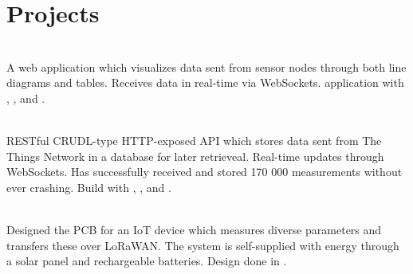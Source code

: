 \documentclass[]{resume-build}
\begin{document}
\begin{minipage}[t]{0.65\textwidth}
\section{Projects}
\\
\descript{}
A web application which visualizes data sent from sensor nodes through both line diagrams and tables. Receives data in real-time via WebSockets.  application with , , and .
\subsectionsep

\\
\descript{}
RESTful CRUDL-type HTTP-exposed API which stores data sent from The Things Network in a database for later retrieveal. Real-time updates through WebSockets. Has successfully received and stored 170 000 measurements without ever crashing. Build with , , and .
\subsectionsep 

\\
\descript{}
Designed the PCB for an IoT device which measures diverse parameters and transfers these over LoRaWAN. The system is self-supplied with energy through a solar panel and rechargeable batteries. Design done in .
\subsectionsep


\end{minipage} 
\end{document}
